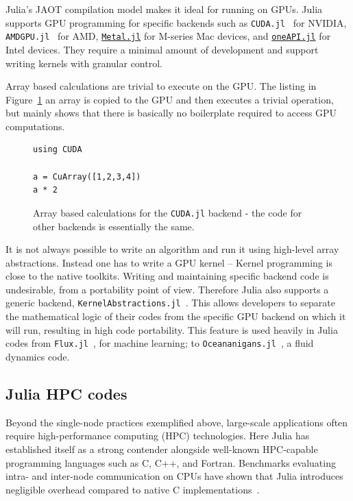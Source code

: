\documentclass{webofc}
\begin{document}
Julia's JAOT compilation model makes it ideal for running on GPUs. Julia
supports GPU programming for specific backends such as
\texttt{CUDA.jl}~\cite{besard2018juliagpu} for NVIDIA,
\texttt{AMDGPU.jl}~\cite{julian_samaroo_2025_14826765} for AMD,
\href{https://github.com/JuliaGPU/Metal.jl}{\texttt{Metal.jl}} for M-series Mac
devices, and \href{https://github.com/JuliaGPU/oneAPI.jl}{\texttt{oneAPI.jl}}
for Intel devices. They require a minimal amount of development and support
writing kernels with granular control.

Array based calculations are trivial to execute on the GPU. The listing in
Figure~\ref{code:arraysgpu} an array is copied to the GPU and then executes a
trivial operation, but mainly shows that there is basically no boilerplate required to access GPU computations. 

\begin{figure}[!ht]
\begin{center}
\begin{verbatim}
using CUDA

a = CuArray([1,2,3,4])
a * 2
\end{verbatim}
\caption{Array based calculations for the \texttt{CUDA.jl} backend - the code for other backends is essentially the same.}
\label{code:arraysgpu}
\end{center}
\end{figure}

It is not always possible to write an algorithm and run it using high-level
array abstractions. Instead one has to write a GPU kernel -- Kernel
programming is close to the native toolkits.  Writing and maintaining specific
backend code is undesirable, from a portability point of view. Therefore Julia
also supports a generic backend,
\texttt{KernelAbstractions.jl}~\cite{BESARD201929,8471188}. This allows
developers to separate the mathematical logic of their codes from the specific
GPU backend on which it will run, resulting in high code portability. This
feature is used heavily in Julia codes from \texttt{Flux.jl}~\cite{innes:2018},
for machine learning; to
\texttt{Oceananigans.jl}~\cite{Ramadhan_Oceananigans_jl_Fast_and_2020}, a fluid
dynamics code.

\subsection{Julia HPC codes}
\label{sec:julia-hpc}
Beyond the single-node practices exemplified above, large-scale applications
often require high-performance computing (HPC) technologies. Here Julia has
established itself as a strong contender alongside well-known HPC-capable
programming languages such as C, C++, and Fortran. Benchmarks evaluating intra-
and inter-node communication on CPUs have shown that Julia introduces negligible
overhead compared to native C implementations~\cite{hunold2020benchmarking}. 
\end{document}
